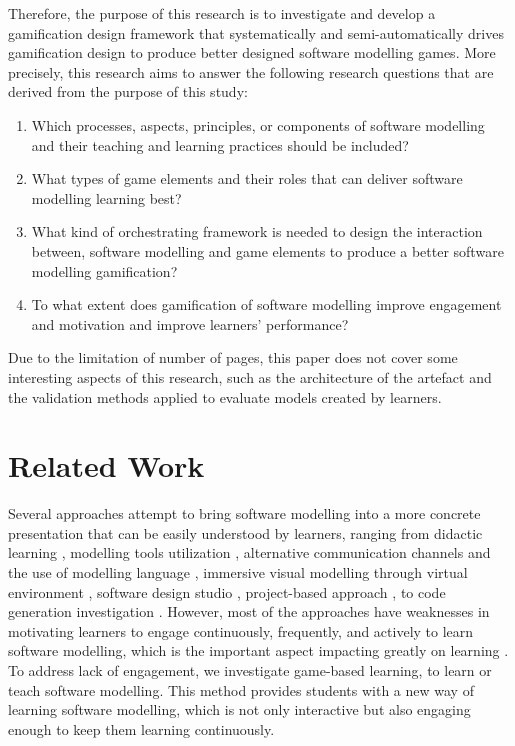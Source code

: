 \documentclass[runningheads,a4paper]{llncs}
\begin{document}
Therefore, the purpose of this research is to investigate and develop a gamification design framework that systematically and semi-automatically drives gamification design to produce better designed software modelling games. More precisely, this research aims to answer the following research questions that are derived from the purpose of this study:
\begin{enumerate}
\item Which processes, aspects, principles, or components of software modelling and their teaching and learning practices should be included?
\item What types of game elements and their roles that can deliver software modelling learning best? 
\item What kind of orchestrating framework is needed to design the interaction between, software modelling and game elements to produce a better software modelling gamification?
\item To what extent does gamification of software modelling improve engagement and motivation and improve learners’ performance?
\end{enumerate}

Due to the limitation of number of pages, this paper does not cover some interesting aspects of this research, such as the architecture of the artefact and the validation methods applied to evaluate models created by learners. 

\section{Related Work}
Several approaches attempt to bring software modelling into a more concrete presentation that can be easily understood by learners, ranging from didactic learning \cite{moisan2009teaching}, modelling tools utilization \cite{Akayama2013}, alternative communication channels and the use of modelling language \cite{Brandsteidl2011}, immersive visual modelling through virtual environment \cite{neubauer2003immersive}, software design studio \cite{Whittle2014}, project-based approach \cite{Szmurlo2007}, to code generation investigation \cite{schmidt2014teaching}. However, most of the approaches have weaknesses in motivating learners to engage continuously, frequently, and actively to learn software modelling, which is the important aspect impacting greatly on learning \cite{Naps2005}. To address lack of engagement, we investigate game-based learning, to learn or teach software modelling. This method provides students with a new way of learning software modelling, which is not only interactive but also engaging enough to keep them learning continuously. 
\end{document}
